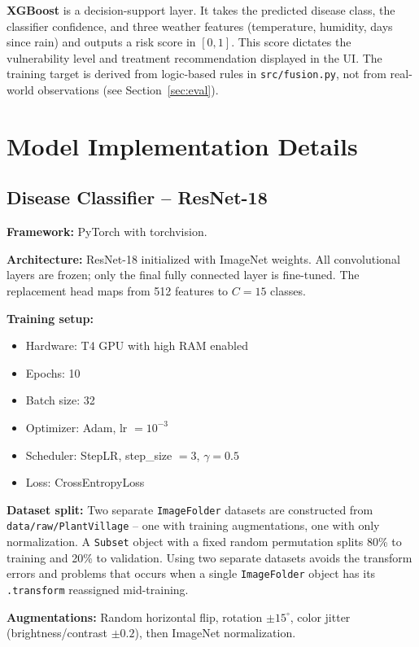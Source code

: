 \documentclass[conference]{IEEEtran}
\begin{document}
\textbf{XGBoost} is a decision-support layer. It takes the predicted disease class, the classifier confidence, and three weather features (temperature, humidity, days since rain) and outputs a risk score in $[0, 1]$. This score dictates the vulnerability level and treatment recommendation displayed in the UI. The training target is derived from logic-based rules in \texttt{src/fusion.py}, not from real-world observations (see Section~\ref{sec:eval}).

\section{Model Implementation Details}

\subsection{Disease Classifier -- ResNet-18}

\textbf{Framework:} PyTorch with torchvision.

\textbf{Architecture:} ResNet-18 initialized with ImageNet weights. All convolutional layers are frozen; only the final fully connected layer is fine-tuned. The replacement head maps from 512 features to $C = 15$ classes.

\textbf{Training setup:}
\begin{itemize}[noitemsep]
  \item Hardware: T4 GPU with high RAM enabled
  \item Epochs: 10
  \item Batch size: 32
  \item Optimizer: Adam, lr $= 10^{-3}$
  \item Scheduler: StepLR, step\_size $= 3$, $\gamma = 0.5$
  \item Loss: CrossEntropyLoss
\end{itemize}

\textbf{Dataset split:} Two separate \texttt{ImageFolder} datasets are constructed from \texttt{data/raw/PlantVillage} -- one with training augmentations, one with only normalization. A \texttt{Subset} object with a fixed random permutation splits 80\% to training and 20\% to validation. Using two separate datasets avoids the transform errors and problems that occurs when a single \texttt{ImageFolder} object has its \texttt{.transform} reassigned mid-training.

\textbf{Augmentations:} Random horizontal flip, rotation $\pm 15^\circ$, color jitter (brightness/contrast $\pm 0.2$), then ImageNet normalization.
\end{document}
